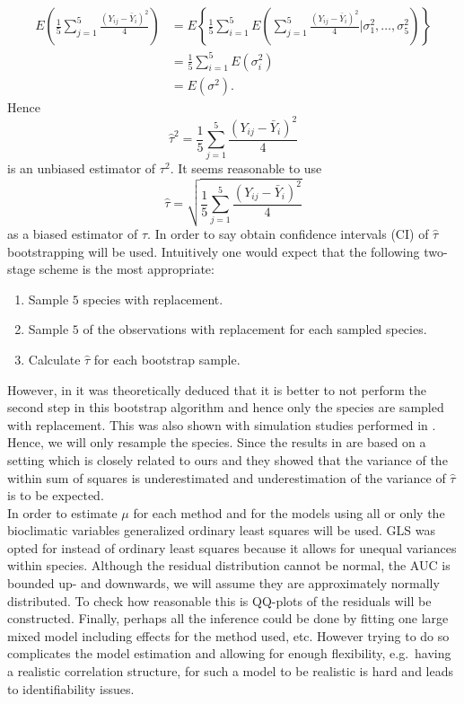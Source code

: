 \begin{align*}
E\left(\frac{1}{5} \sum_{j= 1}^{5} \frac{(Y_{ij} - \bar{Y}_i)^2}{4}\right)
 & = E\left\lbrace \frac{1}{5} \sum_{i=1}^5 E\left( \sum_{j= 1}^{5} \frac{(Y_{ij} - \bar{Y}_i)^2}{4}  \bigg\vert \sigma_1^2, \ldots, \sigma_5^2 \right) \right\rbrace \\
& = \frac{1}{5} \sum_{i=1}^5 E \left( \sigma_i ^ 2 \right)  \\
& = E\left( \sigma^2 \right). 
\end{align*}
Hence
 \[\hat{\tau}^2 = \frac{1}{5} \sum_{j= 1}^{5} \frac{(Y_{ij} - \bar{Y}_i)^2}{4}\]
 is an unbiased estimator of $\tau^2$. It seems reasonable to use 
\[ 
 \hat{\tau} =\sqrt{\frac{1}{5} \sum_{j= 1}^{5} \frac{(Y_{ij} - \bar{Y}_i)^2}{4}} \]
as a biased estimator of $\tau$. In order to say obtain confidence intervals (CI) of $\hat{\tau}$ bootstrapping will be used. Intuitively one would expect that the following two-stage scheme is the most appropriate:
\begin{enumerate}
\item Sample $5$ species with replacement.
\item Sample $5$ of the observations with replacement for each sampled species.
\item Calculate $\hat{\tau}$ for each bootstrap sample.
\end{enumerate}
However, in \cite{field_bootstrapping_2007} it was theoretically deduced that it is better to not perform the second step in this bootstrap algorithm and hence only the species are sampled with replacement. This was also shown with simulation studies performed in \cite{ren_nonparametric_2010}. Hence, we will only resample the species. Since the results in \cite{field_bootstrapping_2007} are based on a setting which is closely related to ours and they showed that the variance of the within sum of squares is underestimated and underestimation of the variance of $\hat{\tau}$ is to be expected. \\
  
In order to estimate $\mu$ for each method and for the models using all or only the bioclimatic variables generalized ordinary least squares will be used. GLS was opted for instead of ordinary least squares because it allows for unequal variances within species. Although the residual distribution cannot be normal, the AUC is bounded up- and downwards, we will assume they are approximately normally distributed. To check how reasonable this is QQ-plots of the residuals will be constructed. Finally, perhaps all the inference could be done by fitting one large mixed model including effects for the method used, etc. However trying to do so complicates the model estimation and allowing for enough flexibility, e.g.\ having a realistic correlation structure, for such a model to be realistic is hard and leads to identifiability issues. 

